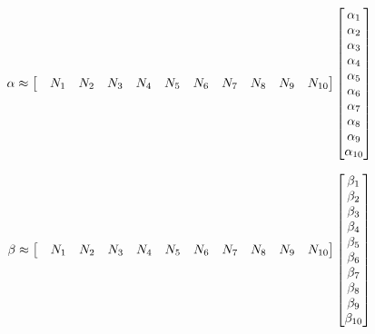 \documentclass{article}
\begin{document}
\begin{align}
        \alpha &\approx
        \setcounter{MaxMatrixCols}{11}
        \begin{bmatrix}
        &N_1 &N_2 &N_3 &N_4 &N_5 &N_6 &N_7 &N_8 &N_9 &N_{10}
        \end{bmatrix}
        \setcounter{MaxMatrixCols}{11}
        \begin{bmatrix}
        \alpha_1 \\
        \alpha_2 \\
        \alpha_3 \\
        \alpha_4 \\
        \alpha_5 \\
        \alpha_6 \\
        \alpha_7 \\
        \alpha_8 \\
        \alpha_9 \\
        \alpha_{10}
        \end{bmatrix}
\end{align}

\begin{align}
\vspace{10mm} %
        \beta &\approx
        \setcounter{MaxMatrixCols}{11}
        \begin{bmatrix}
        &N_1 &N_2 &N_3 &N_4 &N_5 &N_6 &N_7 &N_8 &N_9 &N_{10}
        \end{bmatrix}
        \setcounter{MaxMatrixCols}{11}
        \begin{bmatrix}
        \beta_1 \\
        \beta_2 \\
        \beta_3 \\
        \beta_4 \\
        \beta_5 \\
        \beta_6 \\
        \beta_7 \\
        \beta_8 \\
        \beta_9 \\
        \beta_{10}
        \end{bmatrix}
\end{align}
\end{document}
